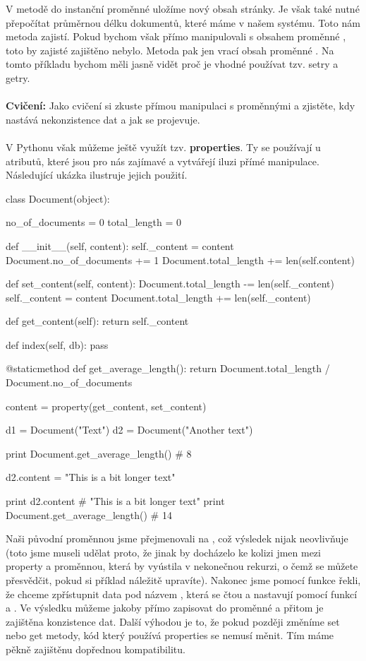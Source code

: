 V metodě  do instanční proměnné  uložíme nový obsah stránky.
Je však také nutné přepočítat průměrnou délku dokumentů, které máme v našem systému. Toto nám metoda
 zajistí. Pokud bychom však přímo manipulovali s obsahem proměnné ,
toto by zajisté zajištěno nebylo. Metoda  pak jen vrací obsah proměnné .
Na tomto příkladu bychom měli jasně vidět proč je vhodné používat tzv. setry a getry.
\\
\\
\noindent
{\textbf{Cvičení:}}
Jako cvičení si zkuste přímou manipulaci s proměnnými a zjistěte, kdy nastává nekonzistence dat a jak
se projevuje.
\\
\\
V Pythonu však můžeme ještě využít tzv. \textbf{properties}. Ty se používají u atributů, které jsou pro
nás zajímavé a vytvářejí iluzi přímé manipulace. Následující ukázka ilustruje jejich použití.

\begin{python}
class Document(object):
    
    no_of_documents = 0
    total_length = 0

    def __init__(self, content):
        self._content = content
        Document.no_of_documents += 1
        Document.total_length += len(self.content)

    def set_content(self, content):
        Document.total_length -= len(self._content)
        self._content = content
        Document.total_length += len(self._content)

    def get_content(self):
        return self._content

    def index(self, db):
        pass

    @staticmethod
    def get_average_length():
        return Document.total_length / Document.no_of_documents

    content = property(get_content, set_content)

d1 = Document("Text")
d2 = Document("Another text")

print Document.get_average_length() # 8

d2.content = "This is a bit longer text"

print d2.content # "This is a bit longer text"
print Document.get_average_length() # 14
\end{python}

Naši původní proměnnou  jsme přejmenovali na , což výsledek nijak neovlivňuje
(toto jsme museli udělat proto, že jinak by docházelo ke kolizi jmen mezi property a proměnnou, která by
vyústila v nekonečnou rekurzi, o čemž se můžete přesvědčit, pokud si příklad náležitě upravíte).
Nakonec jsme pomocí funkce  řekli, že chceme zpřístupnit data pod názvem ,
která se čtou a nastavují pomocí
funkcí  a .
Ve výsledku můžeme jakoby přímo zapisovat do proměnné  a přitom je zajištěna konzistence dat.
Další výhodou je to, že pokud později změníme set nebo get metody, kód který používá properties se nemusí
měnit. Tím máme pěkně zajištěnu dopřednou kompatibilitu.


